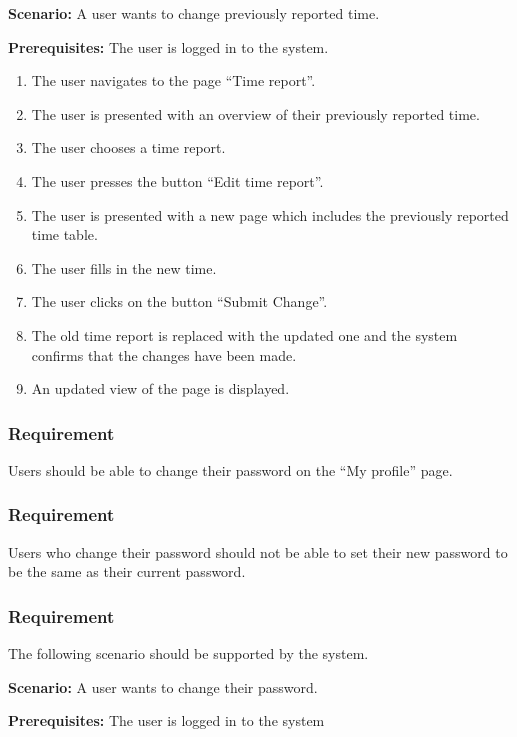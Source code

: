 \documentclass{article}
\begin{document}
\textbf{Scenario:} A user wants to change previously reported time.

\textbf{Prerequisites:} The user is logged in to the system.

\begin{enumerate}

\item The user navigates to the page “Time report”.
\item The user is presented with an overview of their previously reported time. 
\item The user chooses a time report.
\item The user presses the button “Edit time report”.
\item The user is presented with a new page which includes the previously reported time table. 
\item The user fills in the new time.
\item The user clicks on the button “Submit Change”.
\item The old time report is replaced with the updated one and the system confirms that the changes have been made.  
\item An updated view of the page is displayed.

\end{enumerate}

\subsubsection{Requirement}
Users should be able to change their password on the “My profile” page.
\subsubsection{Requirement}
Users who change their password should not be able to set their new password to be the same as their current password.

\subsubsection{Requirement}
The following scenario should be supported by the system.

\textbf{Scenario:} A user wants to change their password.

\textbf{Prerequisites:} The user is logged in to the system
\end{document}
